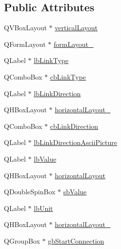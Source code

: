 \subsection*{Public Attributes}
\begin{DoxyCompactItemize}
\item 
Q\-V\-Box\-Layout $\ast$ \hyperlink{class_ui__mdt_cl_article_link_dialog_a2b08d416f5daa92e6eb0fc87ec1fe3f6}{vertical\-Layout}
\item 
Q\-Form\-Layout $\ast$ \hyperlink{class_ui__mdt_cl_article_link_dialog_a757474e7f792746725f9d8f5c52d9833}{form\-Layout\-\_}
\item 
Q\-Label $\ast$ \hyperlink{class_ui__mdt_cl_article_link_dialog_a4ed69aae1565241d8dd0f8f451c38b76}{lb\-Link\-Type}
\item 
Q\-Combo\-Box $\ast$ \hyperlink{class_ui__mdt_cl_article_link_dialog_a09604109a10657c71de819099aa2a9fe}{cb\-Link\-Type}
\item 
Q\-Label $\ast$ \hyperlink{class_ui__mdt_cl_article_link_dialog_a58f74c65a6847e0a524d99bdc6b2c660}{lb\-Link\-Direction}
\item 
Q\-H\-Box\-Layout $\ast$ \hyperlink{class_ui__mdt_cl_article_link_dialog_ac7e0a1beaacbe3389d1c4e5ecd4883a9}{horizontal\-Layout\-\_}
\item 
Q\-Combo\-Box $\ast$ \hyperlink{class_ui__mdt_cl_article_link_dialog_a68d436550895e816263e5fa070701247}{cb\-Link\-Direction}
\item 
Q\-Label $\ast$ \hyperlink{class_ui__mdt_cl_article_link_dialog_aa5dac2f5f98845adbc8fedceceeac71e}{lb\-Link\-Direction\-Ascii\-Picture}
\item 
Q\-Label $\ast$ \hyperlink{class_ui__mdt_cl_article_link_dialog_a92ce984726af591160d5db71ff81e906}{lb\-Value}
\item 
Q\-H\-Box\-Layout $\ast$ \hyperlink{class_ui__mdt_cl_article_link_dialog_ab7765fc6d8bc959da371062c746615a6}{horizontal\-Layout}
\item 
Q\-Double\-Spin\-Box $\ast$ \hyperlink{class_ui__mdt_cl_article_link_dialog_a00018187b69f670a46eee24b810eb27c}{sb\-Value}
\item 
Q\-Label $\ast$ \hyperlink{class_ui__mdt_cl_article_link_dialog_a16eae76f4a5b7309cd4e7ac12a9e9e77}{lb\-Unit}
\item 
Q\-H\-Box\-Layout $\ast$ \hyperlink{class_ui__mdt_cl_article_link_dialog_a72a6761ddd35e94d8e77d3eb931aba48}{horizontal\-Layout\-\_}
\item 
Q\-Group\-Box $\ast$ \hyperlink{class_ui__mdt_cl_article_link_dialog_a9031d2d53e2137b8cf6512039043fe49}{gb\-Start\-Connection}

\end{DoxyCompactItemize}
